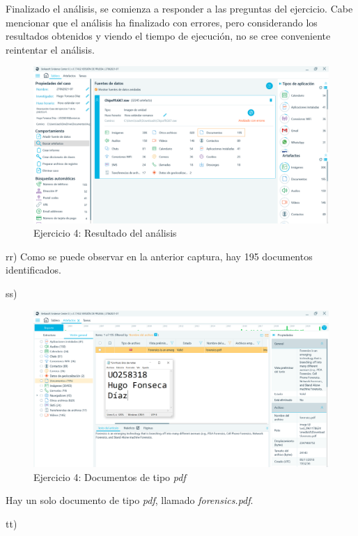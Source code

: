 \documentclass[11pt]{article}
\begin{document}
Finalizado el análisis, se comienza a responder a las preguntas del ejercicio. Cabe mencionar que el análisis ha finalizado con errores, pero considerando los resultados obtenidos y viendo el tiempo de ejecución, no se cree conveniente reintentar el análisis.

\begin{figure}[H]
    \caption{Ejercicio 4: Resultado del análisis}
    \centering
    \includegraphics[scale=0.4]{p04/e7-9.PNG}
\end{figure}

rr) Como se puede observar en la anterior captura, hay 195 documentos identificados.

ss) 

\begin{figure}[H]
    \caption{Ejercicio 4: Documentos de tipo \textit{pdf}}
    \centering
    \includegraphics[scale=0.4]{p04/e7-10.PNG}
\end{figure}

Hay un solo documento de tipo \textit{pdf}, llamado \textit{forensics.pdf}.

tt)
\end{document}
